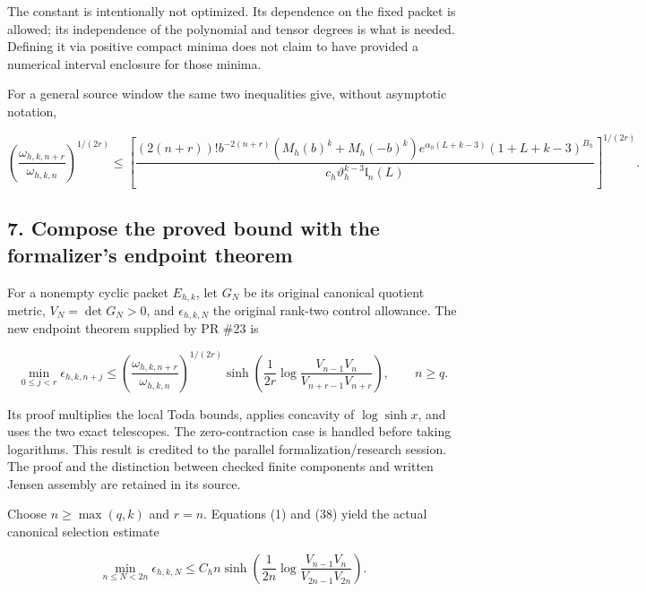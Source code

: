 The constant is intentionally not optimized. Its dependence on the fixed packet is allowed; its independence of the polynomial and tensor degrees is what is needed. Defining it via positive compact minima does not claim to have provided a numerical interval enclosure for those minima.

For a general source window the same two inequalities give, without asymptotic notation,

\[
 \left(\frac{\omega_{h,k,n+r}}{\omega_{h,k,n}}\right)^{1/(2r)}
 \le\left[
 \frac{(2(n+r))!b^{-2(n+r)}(M_h(b)^k+M_h(-b)^k)
       e^{\alpha_0(L+k-3)}(1+L+k-3)^{B_h}}
      {c_h\vartheta_h^{k-3}\mathfrak l_n(L)}
       \right]^{1/(2r)}.                                               \tag{37}
\]

\subsection{7. Compose the proved bound with the formalizer's endpoint theorem}\label{zlm:endpoint-arithmetic_original--compose-the-proved-bound-with-the-formalizers-endpoint-theorem}

For a nonempty cyclic packet \(E_{h,k}\), let \(G_N\) be its original canonical quotient metric, \(V_N=\det G_N>0\), and \(\epsilon_{h,k,N}\) the original rank-two control allowance. The new endpoint theorem supplied by PR \#23 is

\[
 \min_{0\le j<r}\epsilon_{h,k,n+j}
 \le
 \left(\frac{\omega_{h,k,n+r}}{\omega_{h,k,n}}\right)^{1/(2r)}
 \sinh\!\left(\frac1{2r}
       \log\frac{V_{n-1}V_n}{V_{n+r-1}V_{n+r}}\right),\qquad n\ge q.
                                                                         \tag{38}
\]

Its proof multiplies the local Toda bounds, applies concavity of \(\log\sinh x\), and uses the two exact telescopes. The zero-contraction case is handled before taking logarithms. This result is credited to the parallel formalization/research session. The proof and the distinction between checked finite components and written Jensen assembly are retained in its source.

Choose \(n\ge\max(q,k)\) and \(r=n\). Equations (1) and (38) yield the actual canonical selection estimate

\[
 \boxed{
 \min_{n\le N<2n}\epsilon_{h,k,N}
 \le C_hn\sinh\!\left(\frac1{2n}
                 \log\frac{V_{n-1}V_n}{V_{2n-1}V_{2n}}\right).
 }                                                                     \tag{39}
\]

